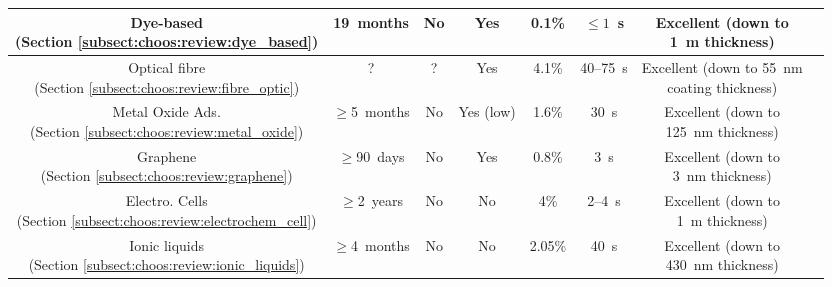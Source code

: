 \begin{table}
\begin{tabularx}{\textwidth}{c|c|c|c|c|c|c|c}
		\specialcell{Dye-based\\(Section \ref{subsect:choos:review:dye_based})} & 19~months & No & Yes & 0.1\% & $\leq1$~s & \specialcell{Excellent (down to\\1~\textmu{}m thickness)} & \specialcell{\cite{mills1997, mills2009, dansby2010, atamanchuk2014}\\\cite{fernandezramos2018, fernandezramos2019}} \\ \hline
		
		\specialcell{Optical fibre\\(Section \ref{subsect:choos:review:fibre_optic})} & ? & ? & Yes & 4.1\% & 40--75~s & \specialcell{Excellent (down to 55~nm\\coating thickness)} & \cite{melo2014, chong2015, hromadka2018}\\ \hline
		
		\specialcell{Metal Oxide Ads.\\(Section \ref{subsect:choos:review:metal_oxide})} & $\geq$5~months & No & Yes (low) & 1.6\% & 30~s & \specialcell{Excellent (down to\\ 125~nm thickness)} & \specialcell{\cite{ishihara1993, mizuno1993, ishihara1995, haeusler1996}\\ \cite{herran2009, jeong2016, joshi2020}}\\ \hline
		
		\specialcell{Graphene\\(Section \ref{subsect:choos:review:graphene})} & $\geq$90~days & No & Yes & 0.8\% & 3~s & \specialcell{Excellent (down to\\ 3~nm thickness)} & \cite{yoon2011, shaban2019, akhter2021}\\ \hline
		
		\specialcell{Electro. Cells\\(Section \ref{subsect:choos:review:electrochem_cell})} & $\geq$2~years & No & No & 4\% & 2--4~s & \specialcell{Excellent (down to\\1~\textmu{}m thickness)} & \cite{kaneyasu2000, lee2009li, choi2013, lee2014}\\ \hline
		
		\specialcell{Ionic liquids\\(Section \ref{subsect:choos:review:ionic_liquids})} & $\geq$4~months & No & No & 2.05\% & 40~s & \specialcell{Excellent (down to\\ 430~nm thickness)} & \specialcell{\cite{chen2011, mineo2012, willa2015}\\ \cite{revsbech2019, fapyane2020}}\\ \hline
		

\end{tabularx}
\end{table}
